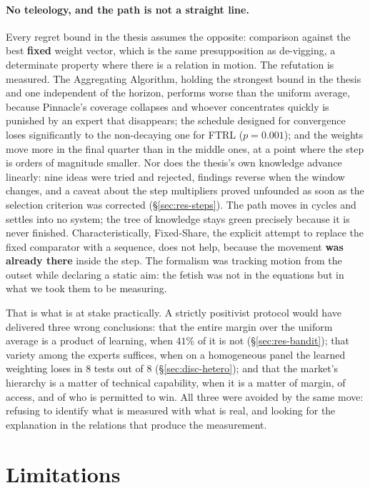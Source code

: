 \documentclass[12pt,a4paper,oneside]{report}
\renewcommand{\_}{\oldunderscore\allowbreak}
\theoremstyle{definition}
\theoremstyle{plain}
\theoremstyle{remark}
\begin{document}
\paragraph{No teleology, and the path is not a straight line.} Every regret bound in the thesis
assumes the opposite: comparison against the best \textbf{fixed} weight vector, which is the same
presupposition as de-vigging, a determinate property where there is a relation in motion. The
refutation is measured. The Aggregating Algorithm, holding the strongest bound in the thesis and
one independent of the horizon, performs worse than the uniform average, because Pinnacle's
coverage collapses and whoever concentrates quickly is punished by an expert that disappears; the
schedule designed for convergence loses significantly to the non-decaying one for FTRL
($p=0.001$); and the weights move more in the final quarter than in the middle ones, at a point
where the step is orders of magnitude smaller. Nor does the thesis's own knowledge advance
linearly: nine ideas were tried and rejected, findings reverse when the window changes, and a
caveat about the step multipliers proved unfounded as soon as the selection criterion was
corrected (\S\ref{sec:res-steps}). The path moves in cycles and settles into no system; the tree
of knowledge stays green precisely because it is never finished. Characteristically, Fixed-Share,
the explicit attempt to replace the fixed comparator with a sequence, does not help, because the
movement \textbf{was already there} inside the step. The formalism was tracking motion from the
outset while declaring a static aim: the fetish was not in the equations but in what we took them
to be measuring.

That is what is at stake practically. A strictly positivist protocol would have delivered three 
wrong conclusions: that the entire margin over the uniform average is a product of learning, when $41\%$ of it is not
(\S\ref{sec:res-bandit}); that variety among the experts suffices, when on a homogeneous panel
the learned weighting loses in 8 tests out of 8 (\S\ref{sec:disc-hetero}); and that the market's
hierarchy is a matter of technical capability, when it is a matter of margin, of access, and of
who is permitted to win. All three were avoided by the same move: refusing to identify what is
measured with what is real, and looking for the explanation in the relations that produce the
measurement.

\section{Limitations}
\label{sec:limits}
\end{document}
